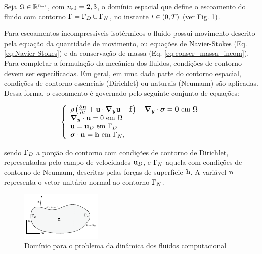 \documentclass[tese_patricia]{subfiles}%
\begin{document}
Seja $\Omega \in \mathbb{R}^{{n_{\mathrm{sd}}}}$, com ${n_{\mathrm{sd}}} = 2,3$, o domínio espacial que define o escoamento do fluido com contorno $\Gamma = \Gamma_{D} \cup \Gamma_{N}$, no instante $t \in (0,T)$ (ver Fig. \ref{fig:dominioFluido}).

Para escoamentos incompressíveis isotérmicos o fluido possui movimento descrito pela equação da quantidade de movimento, ou equações de Navier-Stokes (Eq. \ref{eq:Navier-Stokes}) e da conservação de massa (Eq. \ref{eq:conser_massa_incom}). Para completar a formulação da mecânica dos fluidos, condições de contorno devem ser especificadas. Em geral, em uma dada parte do contorno espacial, condições de contorno essenciais (Dirichlet) ou naturais (Neumann) são aplicadas. Dessa forma, o escoamento é governado pelo seguinte conjunto de equações:

\begin{equation}
	\left\{
	\begin{array}{l}
		\density\left(\frac{\partial\velocity}{\partial t} + \velocity\cdot\gradient\velocity - \sbodyforce \right) - \divergence \cdot \stressTensor = \vzero \ \textrm{em} \ \domain\\
		\divergence \cdot \velocity = 0 \ \textrm{em} \ \domain\\
		\velocity = \velocityD \ \textrm{em} \ \boundaryD \\
		\stressTensor \cdot \snormal = \surfaceLoad \ \textrm{em} \ \boundaryN,
	\end{array} \label{eq:conj_eq_DFC}
	\right.
\end{equation}

\noindent sendo $\Gamma_{D}$ a porção do contorno com condições de contorno de Dirichlet, representadas pelo campo de velocidades $\mathbf{u}_D$, e $\Gamma_{N}$ aquela com condições de contorno de Neumann, descritas pelas forças de superfície $\mathbf{h}$. A variável $\mathbf{n}$ representa o vetor unitário normal ao contorno $\Gamma_{N}$.

\begin{figure}[htb!]
	\centering 
	\includegraphics[scale=3.0,trim=0cm 0.0cm 0cm 0.0cm, clip=true]{Imagens/Cap2/dominioFluido.pdf}	
	\caption{Domínio para o problema da dinâmica dos fluidos computacional}
	\label{fig:dominioFluido}
\end{figure}
\end{document}
